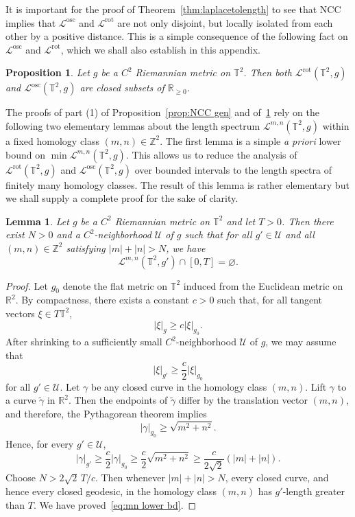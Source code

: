 \documentclass[11pt,letterpaper,oneside]{amsart}
\newcommand{\Z}{\mathbb{Z}}
\newcommand{\R}{\mathbb{R}}
\newcommand{\T}{\mathbb{T}}
\newtheorem{prop}[theo]{Proposition}
\newtheorem{lemm}[theo]{Lemma}
\theoremstyle{definition}
\theoremstyle{remark}
\theoremstyle{definition}
\theoremstyle{remark}
\newcommand{\CL}{\mathcal{L}}
\newcommand{\CU}{\mathcal{U}}
\DeclareMathOperator{\rot}{rot}
\DeclareMathOperator{\osc}{osc}
\begin{document}
It is important for the proof of Theorem~\ref{thm:laplacetolength} to see that NCC implies that $\CL^{\osc}$ and $\CL^{\rot}$ are not only disjoint, but locally isolated from each other by a positive distance.
This is a simple consequence of the following fact on $\CL^{\osc}$ and $\CL^{\rot}$, which we shall also establish in this appendix.

\begin{prop}\label{prop:LSP close}
    Let $g$ be a $C^2$ Riemannian metric on $\T^2$. Then both $\CL^{\rot}(\T^2, g)$ and $\CL^{\osc}(\T^2, g)$ are closed subsets of $\R_{\geq 0}$.
\end{prop}


The proofs of part (1) of Proposition~\ref{prop:NCC gen} and of~\ref{prop:LSP close} rely on the following two elementary lemmas about the length spectrum $\CL^{m,n}(\T^2, g)$ within a fixed homology class $(m,n) \in \Z^2$.
The first lemma is a simple \emph{a priori} lower bound on $\min \CL^{m,n}(\T^2, g)$. 
This allows us to reduce the analysis of $\CL^{\rot}(\T^2, g)$ and $\CL^{\osc}(\T^2, g)$ over bounded intervals to the length spectra of finitely many homology classes.
The result of this lemma is rather elementary but we shall supply a complete proof for the sake of clarity.



\begin{lemm}\label{lem:NCC mn lower bd}
Let $g$ be a $C^2$ Riemannian metric on $\T^2$ and let $T>0$.
Then there exist $N>0$ and a $C^2$-neighborhood $\CU$ of $g$ such that for all $g'\in\CU$ and all $(m,n)\in\Z^2$ satisfying $|m|+|n|>N$, we have
\begin{equation}\label{eq:mn lower bd}
\CL^{m,n}(\T^2,g')\cap [0,T]=\varnothing.    
\end{equation}
\end{lemm}

\begin{proof}
Let $g_0$ denote the flat metric on $\T^2$ induced from the Euclidean metric on $\R^2$.
By compactness, there exists a constant $c>0$ such that, for all tangent vectors $\xi \in T\T^2$,
\[
|\xi|_g \geq c |\xi|_{g_0}.
\]
After shrinking to a sufficiently small $C^2$-neighborhood $\CU$ of $g$, we may assume that
\[
|\xi|_{g'} \geq \frac{c}{2}|\xi|_{g_0}
\]
for all $g' \in \CU$.
Let $\gamma$ be any closed curve in the homology class $(m,n)$. Lift $\gamma$ to a curve $\widetilde\gamma$ in $\R^2$. Then the endpoints of $\widetilde\gamma$ differ by the translation vector $(m,n)$, and therefore, the Pythagorean theorem implies
\[
    |\gamma|_{g_0}
    \geq \sqrt{m^2+n^2}.
\]
Hence, for every $g'\in\CU$,
\[
    |\gamma|_{g'}
    \geq
    \frac{c}{2}|\gamma|_{g_0}
    \geq
    \frac{c}{2}\sqrt{m^2+n^2}
    \geq
    \frac{c}{2\sqrt 2}(|m|+|n|).
\]
Choose $N>2\sqrt 2\,T/c$. Then whenever $|m|+|n|>N$, every closed curve, and hence every closed geodesic, in the homology class $(m,n)$ has $g'$-length greater than $T$. We have proved~\eqref{eq:mn lower bd}.
\end{proof}
\end{document}

